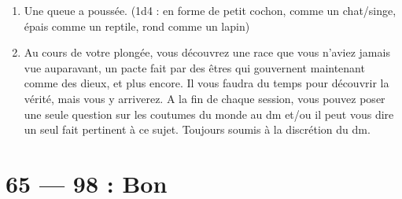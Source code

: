 \documentclass{article}
\begin{document}
\begin{enumerate}
	\item Une queue a poussée. (1d4 : en forme de petit cochon, comme un chat/singe, épais comme un reptile, rond comme un lapin)
	\item Au cours de votre plongée, vous découvrez une race que vous n'aviez jamais vue auparavant, un pacte fait par des êtres qui gouvernent maintenant comme des dieux, et plus encore. Il vous faudra du temps pour découvrir la vérité, mais vous y arriverez. A la fin de chaque session, vous pouvez poser une seule question sur les coutumes du monde au dm et/ou il peut vous dire un seul fait pertinent à ce sujet. Toujours soumis à la discrétion du dm.
\end{enumerate}

\section*{65 --- 98 : Bon}
\end{document}
